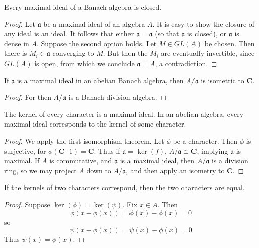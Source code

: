 \begin{lemma}
    Every maximal ideal of a Banach algebra is closed.
\end{lemma}
\begin{proof}
    Let $\mathfrak{a}$ be a maximal ideal of an algebra $A$. It is easy to show the closure of any ideal is an ideal. It follows that either $\overline{\mathfrak{a}} = \mathfrak{a}$ (so that $\mathfrak{a}$ is closed), or $\mathfrak{a}$ is dense in $A$. Suppose the second option holds. Let $M \in GL(A)$ be chosen. Then there is $M_i \in \mathfrak{a}$ converging to $M$. But then the $M_i$ are eventually invertible, since $GL(A)$ is open, from which we conclude $\mathfrak{a} = A$, a contradiction.
\end{proof}

\begin{corollary}
    If $\mathfrak{a}$ is a maximal ideal in an abelian Banach algebra, then $A/\mathfrak{a}$ is isometric to $\mathbf{C}$.
\end{corollary}
\begin{proof}
    For then $A/\mathfrak{a}$ is a Banach division algebra.
\end{proof}

\begin{lemma}
    The kernel of every character is a maximal ideal. In an abelian algebra, every maximal ideal corresponds to the kernel of some character.
\end{lemma}
\begin{proof}
    We apply the first isomorphism theorem. Let $\phi$ be a character. Then $\phi$ is surjective, for $\phi(\mathbf{C} \cdot 1) = \mathbf{C}$. Thus if $\mathfrak{a} = \ker(f)$, $A/\mathfrak{a} \cong \mathbf{C}$, implying $\mathfrak{a}$ is maximal. If $A$ is commutative, and $\mathfrak{a}$ is a maximal ideal, then $A/\mathfrak{a}$ is a division ring, so we may project $A$ down to $A/\mathfrak{a}$, and then apply an isometry to $\mathbf{C}$.
\end{proof}

\begin{lemma}
    If the kernels of two characters correspond, then the two characters are equal.
\end{lemma}
\begin{proof}
    Suppose $\ker(\phi) = \ker(\psi)$. Fix $x \in A$. Then
    \[ \phi(x - \phi(x)) = \phi(x) - \phi(x) = 0 \]
    so
    \[ \psi(x - \phi(x)) = \psi(x) - \phi(x) = 0 \]
    Thus $\psi(x) = \phi(x)$.
\end{proof}

